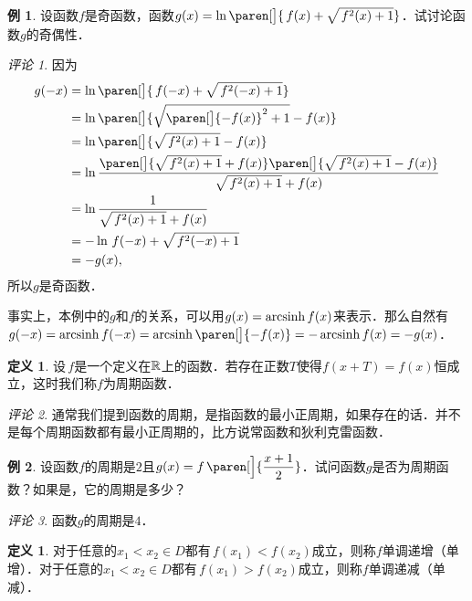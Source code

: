 \documentclass[a4paper,punct=CCT]{ctexbook}
\theoremstyle{definition}
\newtheorem{definition}{定义}
\newtheorem*{definition*}{定义}
\newtheorem*{example*}{例}
\theoremstyle{remark}
\newtheorem*{remark}{评论}
\begin{document}
\begin{example*}
  设函数\(f\)是奇函数，函数\(g(x) = \ln\paren[\big]{\,f(x) + \sqrt{\,f^2(x)+1}}\)．试讨论函数\(g\)的奇偶性．

  \begin{remark}
    因为
    \[
      \begin{split}
        g(-x)
        &= \ln\paren[\big]{\,f(-x) + \sqrt{\,f^2(-x)+1}} \\
        &= \ln\paren[\big]{\sqrt{\paren[\big]{-f(x)}^2+1} - f(x)} \\
        &= \ln\paren[\big]{\sqrt{\,f^2(x)+1} - f(x)} \\
        &= \ln{\frac{\paren[\big]{\sqrt{\,f^2(x)+1} + f(x)}\paren[\big]{\sqrt{\,f^2(x)+1} - f(x)}}{\sqrt{\,f^2(x)+1} + f(x)}} \\
        &= \ln \frac1{\sqrt{\,f^2(x)+1} + f(x)} \\
        &= -\ln{\,f(-x) + \sqrt{\,f^2(-x)+1}} \\
        &= -g(x),
      \end{split}
    \]
    所以\(g\)是奇函数．

    事实上，本例中的\(g\)和\(f\)的关系，可以用\(g(x) = \operatorname{arcsinh} f(x)\)来表示．那么自然有\(g(-x) = \arcsinh f(-x) = \arcsinh\paren[\big]{-f(x)} = - \arcsinh f(x) = -g(x)\)．
  \end{remark}
\end{example*}

\begin{definition*}
  设\(\,f\)是一个定义在\(\mathbb{R}\)上的函数．若存在正数\(T\)使得\(f(x+T) = f(x)\)恒成立，这时我们称\(f\)为周期函数．

  \begin{remark}
    通常我们提到函数的周期，是指函数的最小正周期，如果存在的话．并不是每个周期函数都有最小正周期的，比方说常函数和狄利克雷函数．
  \end{remark}
\end{definition*}

\begin{example*}
  设函数\(f\)的周期是\(2\)且\(g(x) = f\,\paren[\Big]{\dfrac{x+1}{2}}\)．试问函数\(g\)是否为周期函数？如果是，它的周期是多少？\rule{0ex}{3.5ex}

  \begin{remark}
    函数\(g\)的周期是\(4\)．
  \end{remark}
\end{example*}

\begin{definition}
  \label{defn:funcmono}
  对于任意的\(x_1 < x_2 \in D\)都有\(\,f(x_1) < f(x_2)\)成立，则称\(f\)单调递增（单增）．对于任意的\(x_1 < x_2 \in D\)都有\(\,f(x_1) > f(x_2)\)成立，则称\(f\)单调递减（单减）．
\end{definition}
\end{document}
